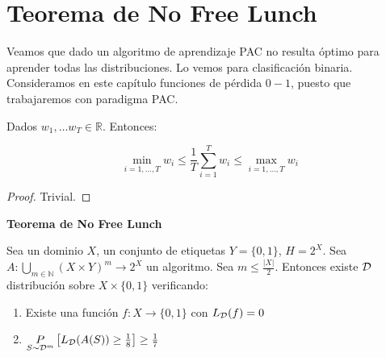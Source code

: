 \section{Teorema de No Free Lunch}
Veamos que dado un algoritmo de aprendizaje PAC no resulta óptimo para aprender todas las distribuciones. 
Lo vemos para clasificación binaria. Consideramos en este capítulo funciones de pérdida $0-1$, puesto que
trabajaremos con paradigma PAC.

\begin{lemma}
 Dados $w_1, \ldots w_T \in \mathbb{R}$. Entonces:
 
 \[\min_{i = 1,\ldots ,T} w_i \le \frac{1}{T} \sum_{i=1}^T w_i \le \max_{i = 1,\ldots,T} w_i\]

 \label{lemma:nfl-ineqs}
\end{lemma}

\begin{proof}
 Trivial.
\end{proof}


\begin{theorem}
\textbf{Teorema de No Free Lunch}

Sea un dominio $X$, un conjunto de etiquetas $Y=\{0,1\}$, $H = 2^X$. 
Sea $A: \underset{m\in \mathbb{N}}{\bigcup} (X\times Y)^m \rightarrow 2^X$ un algoritmo. Sea $m \le \frac{|X|}{2}$.
Entonces existe $\mathcal{D}$ distribución sobre $X\times \{0,1\}$ verificando:

\begin{enumerate}[i]
\item Existe una función $f: X \rightarrow \{0,1\}$ con $L_{\mathcal{D}}(f)=0$
\item $\underset{S\sim \mathcal{D}^m}{P} \left[ L_{\mathcal{D}}(A(S)) \ge \frac{1}{8} \right] \ge \frac{1}{7}$
\end{enumerate}
\end{theorem}


